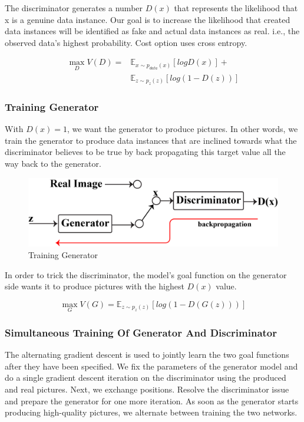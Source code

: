 \documentclass[conference]{IEEEtran}
\begin{document}
The discriminator generates a number $D(x)$ that represents the likelihood that x is a genuine data instance. Our goal is to increase the likelihood that created data instances will be identified as fake and actual data instances as real. i.e., the observed data's highest probability. Cost option uses cross entropy.

\begin{equation}
\begin{split}
\max \limits_{D} V(D) = & \mathbb{E}_{x\sim p_{data}(x)}[log D(x)] + \\& \mathbb{E}_{z\sim p_{z}(z)}[log (1-D(z))]
\end{split}
\end{equation}

\subsubsection{Training Generator}\label{Training Generator}
With $D(x) = 1$, we want the generator to produce pictures. In other words, we train the generator to produce data instances that are inclined towards what the discriminator believes to be true by back propagating this target value all the way back to the generator.

\begin{figure}[h]
\centerline{\includegraphics[width=\linewidth]{Training-Generator}}
\caption{Training Generator}
\label{fig}
\end{figure}

In order to trick the discriminator, the model's goal function on the generator side wants it to produce pictures with the highest $D(x)$ value.

\begin{equation}
\max \limits_{G} V(G) = \mathbb{E}_{z\sim p_{z}(z)}[log(1 - D(G(z)))]
\end{equation}

\subsubsection{Simultaneous Training Of Generator And Discriminator}\label{Simultaneous Training Of Generator And Discriminator}
The alternating gradient descent is used to jointly learn the two goal functions after they have been specified. We fix the parameters of the generator model and do a single gradient descent iteration on the discriminator using the produced and real pictures. Next, we exchange positions. Resolve the discriminator issue and prepare the generator for one more iteration. As soon as the generator starts producing high-quality pictures, we alternate between training the two networks.
\end{document}
